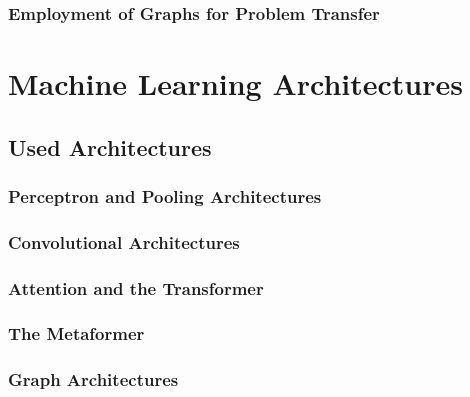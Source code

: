 \documentclass[
headings=optiontohead,              %
12pt,                               %
DIV=13,                             %
twoside=false,                      %
open=right,                         %
BCOR=00mm,                          %
toc=bibliographynumbered            %
]{scrreport}
\begin{document}
        \subsection{Employment of Graphs for Problem Transfer}
        \label{sec:theory-graphs}
        
        \FloatBarrier

\chapter{Machine Learning Architectures}
\label{sec:architectures}

    \section{Used Architectures}
    \label{sec:architectures-theory}
    
        \subsection{Perceptron and Pooling Architectures}
        \label{sec:architectures-perceptron-pooling}
        
        \FloatBarrier
        \subsection{Convolutional Architectures}
        \label{sec:architectures-convolution}
        
        \FloatBarrier
        \subsection{Attention and the Transformer}
        \label{sec:architectures-attention}
        
        \FloatBarrier
        \subsection{The Metaformer}
        \label{sec:architectures-metaformer}
        
        \FloatBarrier
        \subsection{Graph Architectures}
        \label{sec:architectures-graphs}
        
        \FloatBarrier
\end{document}
